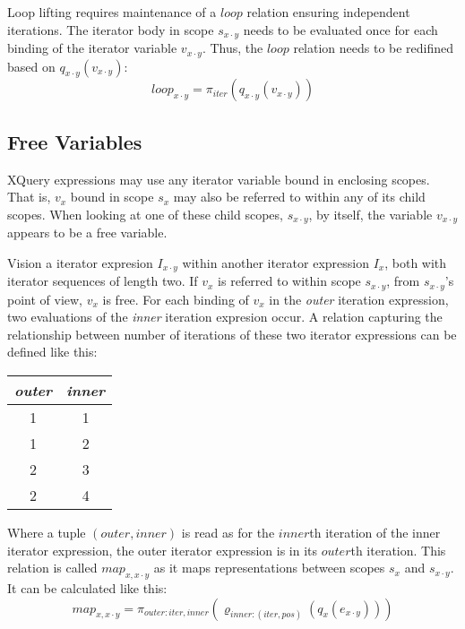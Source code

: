 Loop lifting requires maintenance of a $loop$ relation ensuring independent iterations. The iterator body in
scope $s_{x \cdot y}$ needs to be evaluated once for each binding of the iterator variable $v_{x \cdot y}$.
Thus, the $loop$ relation needs to be redifined based on $q_{x \cdot y}(v_{x \cdot y})$:
\begin{equation}
loop_{x \cdot y} = \pi_{iter}(q_{x \cdot y}(v_{x \cdot y}))
\label{eq:ll:loopxy}
\end{equation}


\subsection{Free Variables}
\label{sect:translation:ll:freeVar}

XQuery expressions may use any iterator variable bound in enclosing scopes. That is, $v_{x}$ bound in
scope $s_{x}$ may also be referred to within any of its child scopes. When looking at one of these child scopes,
$s_{x \cdot y}$, by itself, the variable $v_{x \cdot y}$ appears to be a free variable.

Vision a iterator expresion $I_{x \cdot y}$ within another iterator expression $I_{x}$, both with iterator
sequences of length two. If $v_{x}$ is referred to within scope $s_{x \cdot y}$, from $s_{x \cdot y}$'s point of
view, $v_{x}$ is free. For each binding of $v_{x}$ in the \textit{outer} iteration expression, two
evaluations of the \textit{inner} iteration expresion occur. A relation capturing the relationship between number
of iterations of these two iterator expressions can be defined like this:
\begin{center}
\begin{tabular}{|c|c|}\hline
\textit{outer}	& \textit{inner} 	\\ \hline
1				& 1		\\ \hline
1				& 2		\\ \hline
2				& 3		\\ \hline
2				& 4		\\ \hline
\end{tabular}
\end{center}
Where a tuple $(outer, inner)$ is read as for the $inner$th iteration of the inner iterator expression, the outer
iterator expression is in its $outer$th iteration. This relation is called $map_{x, x\cdot y}$ as it maps
representations between scopes $s_{x}$ and $s_{x \cdot y}$. It can be calculated like this:
\begin{equation}
map_{x, x\cdot y} = \pi_{outer:iter,inner}(\varrho_{inner:(iter,pos)}(q_{x}(e_{x \cdot y})))
\label{eq:ll:mapx_xy}
\end{equation}

